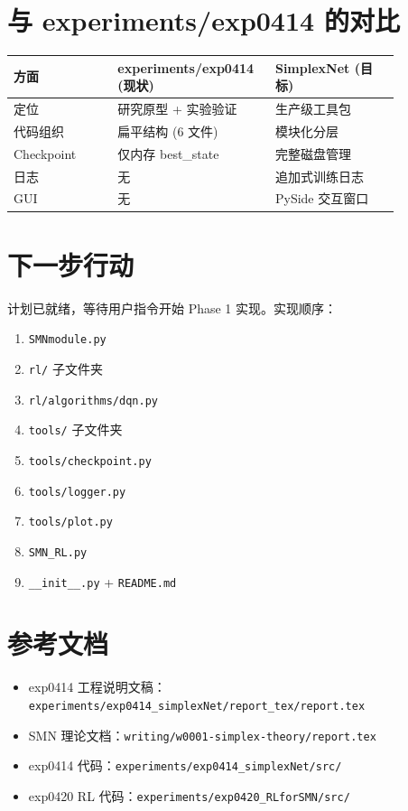 \documentclass[11pt]{ctexart}
\begin{document}
\section{与 experiments/exp0414 的对比}

\begin{center}
\begin{tabular}{p{0.25\linewidth} p{0.3\linewidth} p{0.3\linewidth}}
\toprule
方面 & experiments/exp0414 (现状) & SimplexNet (目标) \\
\midrule
定位 & 研究原型 + 实验验证 & 生产级工具包 \\
代码组织 & 扁平结构 (6 文件) & 模块化分层 \\
Checkpoint & 仅内存 best\_state & 完整磁盘管理 \\
日志 & 无 & 追加式训练日志 \\
GUI & 无 & PySide 交互窗口 \\
\bottomrule
\end{tabular}
\end{center}

\section{下一步行动}

计划已就绪，等待用户指令开始 Phase 1 实现。实现顺序：
\begin{enumerate}[leftmargin=2em]
  \item \texttt{SMNmodule.py}
  \item \texttt{rl/} 子文件夹
  \item \texttt{rl/algorithms/dqn.py}
  \item \texttt{tools/} 子文件夹
  \item \texttt{tools/checkpoint.py}
  \item \texttt{tools/logger.py}
  \item \texttt{tools/plot.py}
  \item \texttt{SMN\_RL.py}
  \item \texttt{\_\_init\_\_.py} + \texttt{README.md}
\end{enumerate}

\section{参考文档}

\begin{itemize}[leftmargin=2em]
  \item exp0414 工程说明文稿：\texttt{experiments/exp0414\_simplexNet/report\_tex/report.tex}
  \item SMN 理论文档：\texttt{writing/w0001-simplex-theory/report.tex}
  \item exp0414 代码：\texttt{experiments/exp0414\_simplexNet/src/}
  \item exp0420 RL 代码：\texttt{experiments/exp0420\_RLforSMN/src/}
\end{itemize}
\end{document}
